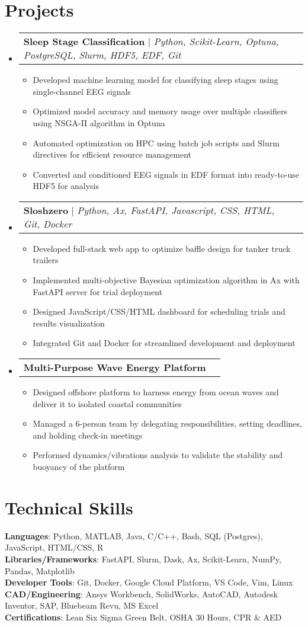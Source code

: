 \documentclass[letterpaper,11pt]{article}
\makeatletter
\newcommand{\resumeItem}[1]{
  \item\small{
    {#1 \vspace{-2pt}}
  }
}
\newcommand{\resumeProjectHeading}[1]{
    \item
    \begin{tabular*}{0.97\textwidth}{l@{\extracolsep{\fill}}r}
      \small#1 \\
    \end{tabular*}\vspace{-7pt}
}
\newcommand{\resumeSubHeadingListStart}{\begin{itemize}[leftmargin=0.15in, label={}]}
\newcommand{\resumeSubHeadingListEnd}{\end{itemize}}
\newcommand{\resumeItemListStart}{\begin{itemize}}
\newcommand{\resumeItemListEnd}{\end{itemize}\vspace{-5pt}}
\makeatother
\begin{document}
\section{Projects}
    \resumeSubHeadingListStart
      \resumeProjectHeading
          {\textbf{Sleep Stage Classification} $|$ \emph{Python, Scikit-Learn, Optuna, PostgreSQL, Slurm, HDF5, EDF, Git}}
          \resumeItemListStart
            \resumeItem{Developed machine learning model for classifying sleep stages using single-channel EEG signals}
            \resumeItem{Optimized model accuracy and memory usage over multiple classifiers using NSGA-II algorithm in Optuna}
            \resumeItem{Automated optimization on HPC using batch job scripts and Slurm directives for efficient resource management}
            \resumeItem{Converted and conditioned EEG signals in EDF format into ready-to-use HDF5 for analysis}
          \resumeItemListEnd
      \resumeProjectHeading
          {\textbf{Sloshzero} $|$ \emph{Python, Ax, FastAPI, Javascript, CSS, HTML, Git, Docker}}
          \resumeItemListStart
            \resumeItem{Developed full-stack web app to optimize baffle design for tanker truck trailers}
            \resumeItem{Implemented multi-objective Bayesian optimization algorithm in Ax with FastAPI server for trial deployment}
            \resumeItem{Designed JavaScript/CSS/HTML dashboard for scheduling trials and results visualization}
            \resumeItem{Integrated Git and Docker for streamlined development and deployment}
          \resumeItemListEnd
      \resumeProjectHeading
          {\textbf{Multi-Purpose Wave Energy Platform}}
          \resumeItemListStart
            \resumeItem{Designed offshore platform to harness energy from ocean waves and deliver it to isolated coastal communities}
            \resumeItem{Managed a 6-person team by delegating responsibilities, setting deadlines, and holding check-in meetings}
            \resumeItem{Performed dynamics/vibrations analysis to validate the stability and buoyancy of the platform}
          \resumeItemListEnd
    \resumeSubHeadingListEnd



%
\section{Technical Skills}
 \begin{itemize}[leftmargin=0.15in, label={}]
    \small{\item{
     \textbf{Languages}{: Python, MATLAB, Java, C/C++, Bash, SQL (Postgres), JavaScript, HTML/CSS, R} \\
     \textbf{Libraries/Frameworks}{: FastAPI, Slurm, Dask, Ax, Scikit-Learn, NumPy, Pandas, Matplotlib} \\
     \textbf{Developer Tools}{: Git, Docker, Google Cloud Platform, VS Code, Vim, Linux} \\
     \textbf{CAD/Engineering}{: Ansys Workbench, SolidWorks, AutoCAD, Autodesk Inventor, SAP, Bluebeam Revu, MS Excel} \\ %
     \textbf{Certifications}{: Lean Six Sigma Green Belt, OSHA 30 Hours, CPR \& AED} \\
    }}
 \end{itemize}


\end{document}
